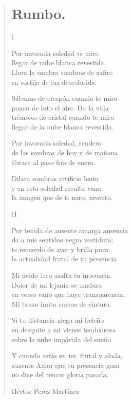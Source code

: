 \documentclass[12pt, twoside]{book}
\begin{document}
\begin{verse}
\begin{center}
\section{Rumbo.}
\end{center}
\begin{center}
I
\end{center}
Por invocada soledad te miro\\
llegar de nube blanca revestida.\\
Llora la sombra sombras de zafiro\\
en sortija de luz descolorida.\newline

Sábanas de crespón cuando te miro\\
ponen de luto el aire. Da la vida\\
trémolos de cristal cuando te miro\\
llegar de la nube blanca revestida.\newline

Por invocada soledad, sendero\\
de las sombras de hoy y de mañana\\
ábrase al paso frío de enero.\newline

Dilata sombras artificio lento\\
y en esta soledad resulta vana\\
la imagen que de ti miro, invento.\newline

\begin{center}
II
\end{center} 

Por tenida de ausente amarga ausencia\\
da a mis sentidos negra vestidura;\\
te recuerdo de ayer y brilla pura\\
la actualidad frutal de tu presencia\newpage

Mi ávido luto asalta tu inocencia.\\
Dolor de mi lejanía se madura\\
en verso vano que huye transparencia.\\
Mi brazo imita curvas de cintura.\newline

Si tu distancia niega mi beleño\\
en desquite a mi vienes temblorosa\\
sobre la nube impávida del sueño\newline

Y cuando estás en mi, frutal y alada,\\
ausente Amor que tu presencia goza\\
no dice del rencor gloria pasada.\newline

Héctor Perez Martínez
\end{verse}
\newpage
\end{document}
